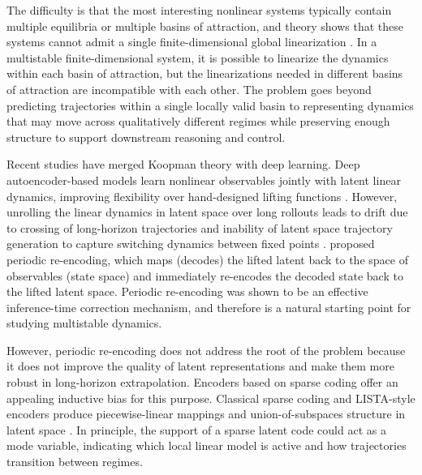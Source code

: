 \documentclass{article}
\begin{document}
The difficulty is that the most interesting nonlinear systems typically contain multiple equilibria or multiple basins of attraction, and theory shows that these systems cannot admit a single finite-dimensional global linearization \citep{lan_linearization_2013, brunton_koopman_2016}. 
In a multistable finite-dimensional system, it is possible to linearize the dynamics within each basin of attraction, but the linearizations needed in different basins of attraction are incompatible with each other. The problem goes beyond predicting trajectories within a single locally valid basin to representing dynamics that may move across qualitatively different regimes while preserving enough structure to support downstream reasoning and control.

Recent studies have merged Koopman theory with deep learning. Deep autoencoder-based models learn nonlinear observables jointly with latent linear dynamics, improving flexibility over hand-designed lifting functions \citep{lusch_deep_2018, azencot_forecasting_2020, shi_deep_2022}. However,  unrolling the linear dynamics in latent space over long rollouts leads to drift due to crossing of long-horizon trajectories and inability of latent space trajectory generation to capture switching dynamics between fixed points \citep{fathi_course_2023}. \citet{fathi_course_2023} proposed periodic re-encoding, which maps (decodes) the lifted latent back to the space of observables (state space) and immediately re-encodes the decoded state back to the lifted latent space. Periodic re-encoding was shown to be an effective inference-time correction mechanism, and therefore is a natural starting point for studying multistable dynamics.

However, periodic re-encoding does not address the root of the problem because it does not improve the quality of latent representations and make them more robust in long-horizon extrapolation. Encoders based on sparse coding offer an appealing inductive bias for this purpose. Classical sparse coding and LISTA-style encoders produce piecewise-linear mappings and union-of-subspaces structure in latent space \citep{olshausen_emergence_1996, chen_atomic_1998, donoho_optimally_2003, gregor_learning_2010}. In principle, the support of a sparse latent code could act as a mode variable, indicating which local linear model is active and how trajectories transition between regimes.
\end{document}
